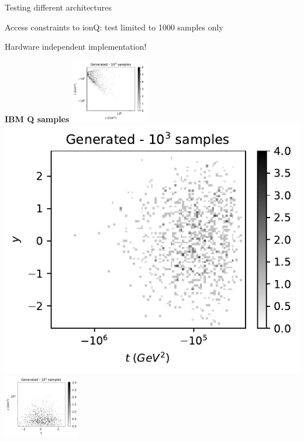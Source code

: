 \documentclass[11pt,aspectratio=169]{beamer}
\begin{document}
\begin{frame}{Testing different architectures}
    \begin{multicols*}{2}
        Access constraints to ionQ: test limited to 1000 samples only
        \begin{tcolorbox}
           Hardware independent implementation!
        \end{tcolorbox}
    \end{multicols*}
    \begin{multicols*}{4}
        \textbf{IBM Q samples}
        \includegraphics[width=0.25\textwidth]{figures/plots/hardware/ibm_santiago/s-t_FAKE_IBM_1k.pdf}
        \includegraphics[width=0.25 \textwidth]{figures/plots/hardware/ibm_santiago/t-y_FAKE_IBM_1k.pdf}
        \includegraphics[width=0.25\textwidth]{figures/plots/hardware/ibm_santiago/y-s_FAKE_IBM_1k.pdf}
    \end{multicols*}


\end{frame}
\end{document}
